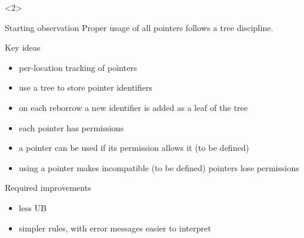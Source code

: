 \begin{frame}[t]
    \begin{onlyenv}<2>
        \begin{block}{Starting observation}
            Proper usage of {\color{red}all pointers} follows a {\color{red}tree} discipline.
        \end{block}
        \begin{block}{Key ideas}
            \begin{itemize}
                \item per-location tracking of pointers
                \item use a {\color{red}tree} to store pointer identifiers
                \item on each reborrow a new identifier is {\color{red}added as a leaf of the tree}
                \item {\color{red}each pointer has permissions}
                \item a pointer can be used {\color{red}if its permission allows it (to be defined)}
                \item using a pointer {\color{red}makes incompatible (to be defined) pointers lose permissions}
            \end{itemize}
        \end{block}
        \begin{block}{Required improvements}
            \begin{itemize}
                \item less UB
                \item simpler rules, with error messages easier to interpret
            \end{itemize}
        \end{block}
    \end{onlyenv}
\end{frame}

